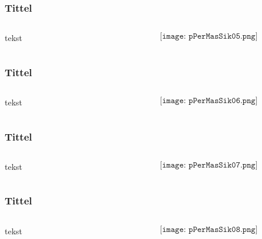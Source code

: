 \documentclass[aspectratio=169,xcolor=dvipsnames]{beamer}
\begin{document}
\begin{frame}
	\frametitle{Tittel}
	\begin{columns}
		\begin{column}{0.5\textwidth}
tekst
			
		\end{column}

		\begin{column}{0.5\textwidth}
	$$\texttt{[image: pPerMasSik05.png]}$$
		\end{column}
	\end{columns}
\end{frame}

\begin{frame}
	\frametitle{Tittel}
	\begin{columns}
		\begin{column}{0.5\textwidth}
tekst
			
		\end{column}

		\begin{column}{0.5\textwidth}
	$$\texttt{[image: pPerMasSik06.png]}$$
		\end{column}
	\end{columns}
\end{frame}

\begin{frame}
	\frametitle{Tittel}
	\begin{columns}
		\begin{column}{0.5\textwidth}
tekst
			
		\end{column}

		\begin{column}{0.5\textwidth}
	$$\texttt{[image: pPerMasSik07.png]}$$
		\end{column}
	\end{columns}
\end{frame}

\begin{frame}
	\frametitle{Tittel}
	\begin{columns}
		\begin{column}{0.5\textwidth}
tekst
			
		\end{column}

		\begin{column}{0.5\textwidth}
	$$\texttt{[image: pPerMasSik08.png]}$$
		\end{column}
	\end{columns}
\end{frame}
\end{document}
